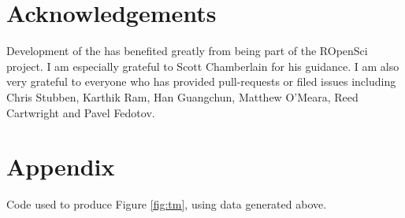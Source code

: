 \section{Acknowledgements}

Development of the  has benefited greatly from being part of the
ROpenSci project. I am especially grateful to Scott Chamberlain for his guidance. 
I am also very grateful to everyone who has provided pull-requests or filed issues 
including Chris Stubben, Karthik Ram, Han Guangchun, Matthew O'Meara, 
Reed Cartwright and Pavel Fedotov.



\address{David J. Winter\\
  Institute of Fundamental Sciences, Massey University\\
  Palmerston North 4442\\
  New Zealand\\
  ORCiD: 0000-0002-6165-0029 \\
}

\section{Appendix}

Code used to produce Figure \ref{fig:tm}, using  data generated above.


